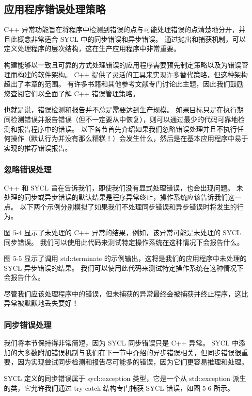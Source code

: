 \subsection{应用程序错误处理策略}
C++ 异常功能旨在将程序中检测到错误的点与可能处理错误的点清楚地分开，并且此概念非常适合 SYCL 中的同步错误和异步错误。 通过抛出和捕获机制，可以定义处理程序的层次结构，这在生产应用程序中非常重要。

构建能够以一致且可靠的方式处理错误的应用程序需要预先制定策略以及为错误管理而构建的软件架构。 C++ 提供了灵活的工具来实现许多替代策略，但这种架构超出了本章的范围。 有许多书籍和其他参考文献专门讨论此主题，因此我们鼓励您查阅它们以全面了解 C++ 错误管理策略。

也就是说，错误检测和报告并不总是需要达到生产规模。 如果目标只是在执行期间检测错误并报告错误（但不一定要从中恢复），则可以通过最少的代码可靠地检测和报告程序中的错误。 以下各节首先介绍如果我们忽略错误处理并且不执行任何操作（默认行为并没有那么糟糕！）会发生什么，然后是在基本应用程序中易于实现的推荐错误报告。

\subsubsection{忽略错误处理}
C++ 和 SYCL 旨在告诉我们，即使我们没有显式处理错误，也会出现问题。 未处理的同步或异步错误的默认结果是程序异常终止，操作系统应该告诉我们这一点。 以下两个示例分别模拟了如果我们不处理同步错误和异步错误时将发生的行为。

图 5-4 显示了未处理的 C++ 异常的结果，例如，该异常可能是未处理的 SYCL 同步错误。 我们可以使用此代码来测试特定操作系统在这种情况下会报告什么。

图 5-5 显示了调用 std::terminate 的示例输出，这将是我们的应用程序中未处理的 SYCL 异步错误的结果。 我们可以使用此代码来测试特定操作系统在这种情况下会报告什么。

尽管我们应该处理程序中的错误，但未捕获的异常最终会被捕获并终止程序，这比异常被默默地丢失要好！

\subsubsection{同步错误处理}
我们将本节保持得非常简短，因为 SYCL 同步错误只是 C++ 异常。 SYCL 中添加的大多数附加错误机制与我们在下一节中介绍的异步错误相关，但同步错误很重要，因为实现尝试同步检测和报告尽可能多的错误，因为它们更容易推理和处理。

SYCL 定义的同步错误属于 sycl::exception 类型，它是一个从 std::exception 派生的类，它允许我们通过 try-catch 结构专门捕获 SYCL 错误，如图 5-6 所示。

